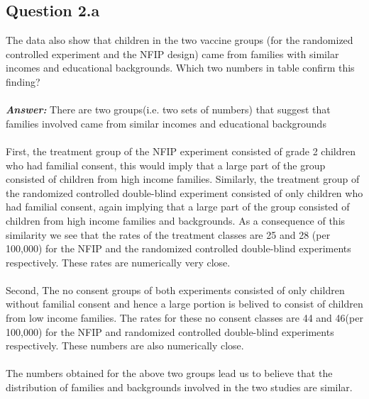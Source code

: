 \documentclass{article}
\begin{document}
\subsection{Question 2.a}
The data also show that children in the two vaccine groups (for the randomized controlled experiment and the NFIP design) came from families with similar incomes and educational backgrounds. Which two numbers in table confirm this finding?
\\
\\
\textit{\textbf{Answer: }} There are two groups(i.e. two sets of numbers) that suggest that families involved came from similar incomes and educational backgrounds
\\\\
 First, the treatment group of the NFIP experiment consisted of grade 2 children who had familial consent, this would imply that a large part of the group consisted of children from high income families. Similarly, the treatment group of the randomized controlled double-blind experiment consisted of only children who had familial consent, again implying that a large part of the group consisted of children from high income families and backgrounds. As a consequence of this similarity we see that the rates of the treatment classes are 25 and 28 (per 100,000) for the NFIP and the randomized controlled double-blind experiments respectively. These rates are numerically very close.
\\\\
 Second, The no consent groups of both experiments consisted of only children without familial consent and hence a large portion is belived to consist of children from low income families. The rates for these no consent classes are 44 and 46(per 100,000) for the NFIP and randomized controlled double-blind experiments respectively. These numbers are also numerically close.
\\\\
The numbers obtained for the above two groups lead us to believe that the distribution of families and backgrounds involved in the two studies are similar.
\end{document}
